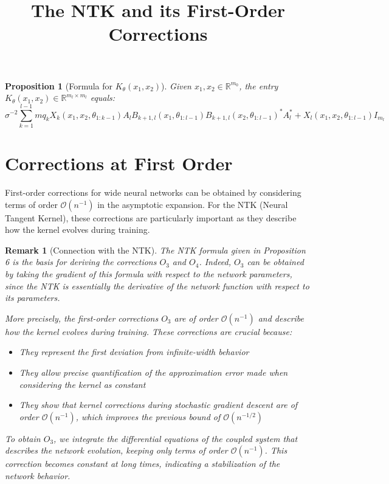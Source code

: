 \documentclass{article}
\title{The NTK and its First-Order Corrections}
\author{}
\date{}
\newtheorem{proposition}{Proposition}
\newtheorem{remark}{Remark}
\begin{document}
\maketitle

\begin{proposition}[Formula for $K_\theta(x_1,x_2)$]
Given $x_1,x_2 \in \mathbb{R}^{m_0}$, the entry $K_\theta(x_1,x_2) \in \mathbb{R}^{m_l \times m_l}$ equals:
\begin{equation}
\sigma^{-2} \sum_{k=1}^{l-1} m q_k X_k(x_1,x_2,\theta_{1:k-1})A_l B_{k+1,l}(x_1,\theta_{1:l-1})B_{k+1,l}(x_2,\theta_{1:l-1})^*A_l^* + X_l(x_1,x_2,\theta_{1:l-1})I_{m_l}
\end{equation}
\end{proposition}

\section{Corrections at First Order}

First-order corrections for wide neural networks can be obtained by considering terms of order $\mathcal{O}(n^{-1})$ in the asymptotic expansion. For the NTK (Neural Tangent Kernel), these corrections are particularly important as they describe how the kernel evolves during training.

\begin{remark}[Connection with the NTK]
The NTK formula given in Proposition 6 is the basis for deriving the corrections $O_3$ and $O_4$. Indeed, $O_3$ can be obtained by taking the gradient of this formula with respect to the network parameters, since the NTK is essentially the derivative of the network function with respect to its parameters.

More precisely, the first-order corrections $O_3$ are of order $\mathcal{O}(n^{-1})$ and describe how the kernel evolves during training. These corrections are crucial because:
\begin{itemize}
\item They represent the first deviation from infinite-width behavior
\item They allow precise quantification of the approximation error made when considering the kernel as constant
\item They show that kernel corrections during stochastic gradient descent are of order $\mathcal{O}(n^{-1})$, which improves the previous bound of $\mathcal{O}(n^{-1/2})$
\end{itemize}

To obtain $O_3$, we integrate the differential equations of the coupled system that describes the network evolution, keeping only terms of order $\mathcal{O}(n^{-1})$. This correction becomes constant at long times, indicating a stabilization of the network behavior.
\end{remark}
\end{document}
